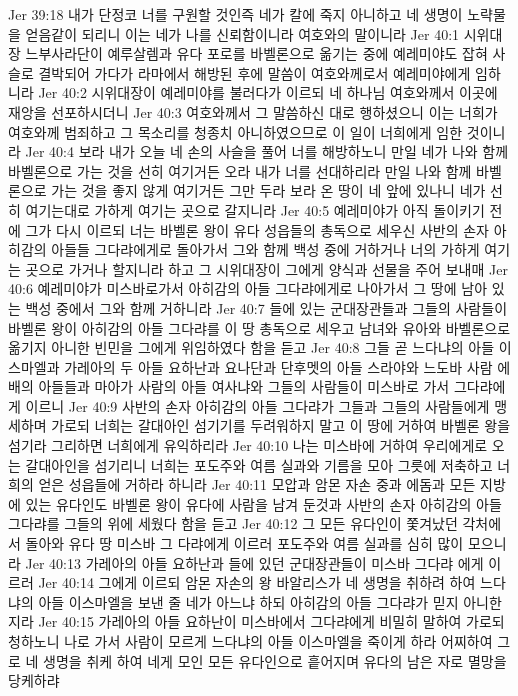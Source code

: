 Jer 39:18  내가 단정코 너를 구원할 것인즉 네가 칼에 죽지 아니하고 네 생명이 노략물을 얻음같이 되리니 이는 네가 나를 신뢰함이니라 여호와의 말이니라
Jer 40:1  시위대장 느부사라단이 예루살렘과 유다 포로를 바벨론으로 옮기는 중에 예레미야도 잡혀 사슬로 결박되어 가다가 라마에서 해방된 후에 말씀이 여호와께로서 예레미야에게 임하니라
Jer 40:2  시위대장이 예레미야를 불러다가 이르되 네 하나님 여호와께서 이곳에 재앙을 선포하시더니
Jer 40:3  여호와께서 그 말씀하신 대로 행하셨으니 이는 너희가 여호와께 범죄하고 그 목소리를 청종치 아니하였으므로 이 일이 너희에게 임한 것이니라
Jer 40:4  보라 내가 오늘 네 손의 사슬을 풀어 너를 해방하노니 만일 네가 나와 함께 바벨론으로 가는 것을 선히 여기거든 오라 내가 너를 선대하리라 만일 나와 함께 바벨론으로 가는 것을 좋지 않게 여기거든 그만 두라 보라 온 땅이 네 앞에 있나니 네가 선히 여기는대로 가하게 여기는 곳으로 갈지니라
Jer 40:5  예레미야가 아직 돌이키기 전에 그가 다시 이르되 너는 바벨론 왕이 유다 성읍들의 총독으로 세우신 사반의 손자 아히감의 아들들 그다랴에게로 돌아가서 그와 함께 백성 중에 거하거나 너의 가하게 여기는 곳으로 가거나 할지니라 하고 그 시위대장이 그에게 양식과 선물을 주어 보내매
Jer 40:6  예레미야가 미스바로가서 아히감의 아들 그다랴에게로 나아가서 그 땅에 남아 있는 백성 중에서 그와 함께 거하니라
Jer 40:7  들에 있는 군대장관들과 그들의 사람들이 바벨론 왕이 아히감의 아들 그다랴를 이 땅 총독으로 세우고 남녀와 유아와 바벨론으로 옮기지 아니한 빈민을 그에게 위임하였다 함을 듣고
Jer 40:8  그들 곧 느다냐의 아들 이스마엘과 가레아의 두 아들 요하난과 요나단과 단후멧의 아들 스라야와 느도바 사람 에배의 아들들과 마아가 사람의 아들 여사냐와 그들의 사람들이 미스바로 가서 그다랴에게 이르니
Jer 40:9  사반의 손자 아히감의 아들 그다랴가 그들과 그들의 사람들에게 맹세하며 가로되 너희는 갈대아인 섬기기를 두려워하지 말고 이 땅에 거하여 바벨론 왕을 섬기라 그리하면 너희에게 유익하리라
Jer 40:10  나는 미스바에 거하여 우리에게로 오는 갈대아인을 섬기리니 너희는 포도주와 여름 실과와 기름을 모아 그릇에 저축하고 너희의 얻은 성읍들에 거하라 하니라
Jer 40:11  모압과 암몬 자손 중과 에돔과 모든 지방에 있는 유다인도 바벨론 왕이 유다에 사람을 남겨 둔것과 사반의 손자 아히감의 아들 그다랴를 그들의 위에 세웠다 함을 듣고
Jer 40:12  그 모든 유다인이 쫓겨났던 각처에서 돌아와 유다 땅 미스바 그 다랴에게 이르러 포도주와 여름 실과를 심히 많이 모으니라
Jer 40:13  가레아의 아들 요하난과 들에 있던 군대장관들이 미스바 그다랴 에게 이르러
Jer 40:14  그에게 이르되 암몬 자손의 왕 바알리스가 네 생명을 취하려 하여 느다냐의 아들 이스마엘을 보낸 줄 네가 아느냐 하되 아히감의 아들 그다랴가 믿지 아니한지라
Jer 40:15  가레아의 아들 요하난이 미스바에서 그다랴에게 비밀히 말하여 가로되 청하노니 나로 가서 사람이 모르게 느다냐의 아들 이스마엘을 죽이게 하라 어찌하여 그로 네 생명을 취케 하여 네게 모인 모든 유다인으로 흩어지며 유다의 남은 자로 멸망을 당케하랴
